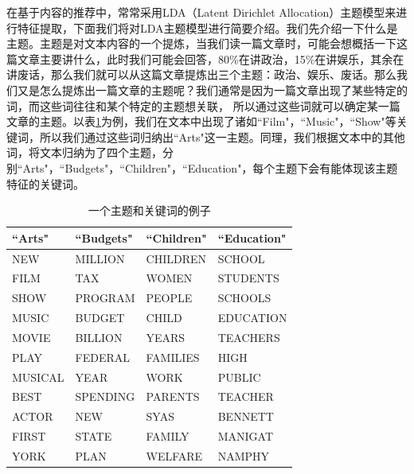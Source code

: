 \documentclass[master,winfonts]{njuthesis}
\begin{document}
在基于内容的推荐中，常常采用LDA（Latent Dirichlet Allocation）\cite{Blei2003Latent}主题模型来进行特征提取，下面我们将对LDA主题模型进行简要介绍。我们先介绍一下什么是主题。主题是对文本内容的一个提炼，当我们读一篇文章时，可能会想概括一下这篇文章主要讲什么，此时我们可能会回答，80\%在讲政治，15\%在讲娱乐，其余在讲废话，那么我们就可以从这篇文章提炼出三个主题：政治、娱乐、废话。那么我们又是怎么提炼出一篇文章的主题呢？我们通常是因为一篇文章出现了某些特定的词，而这些词往往和某个特定的主题想关联， 所以通过这些词就可以确定某一篇文章的主题。以表\ref{topic_table}为例，我们在文本中出现了诸如``Film"，``Music"，``Show"等关键词，所以我们通过这些词归纳出``Arts"这一主题。同理，我们根据文本中的其他词，将文本归纳为了四个主题，分别``Arts"，``Budgets"，``Children"，``Education"，每个主题下会有能体现该主题特征的关键词。
\begin{table}[htbp]
\centering
\caption{一个主题和关键词的例子}
\label{topic_table}
\begin{tabular}{llll}
\hline
``Arts"  & ``Budgets" & ``Children" & ``Education" \\ \hline
NEW     & MILLION   & CHILDREN   & SCHOOL      \\
FILM    & TAX       & WOMEN      & STUDENTS    \\
SHOW    & PROGRAM   & PEOPLE     & SCHOOLS     \\
MUSIC   & BUDGET    & CHILD      & EDUCATION   \\
MOVIE   & BILLION   & YEARS      & TEACHERS    \\
PLAY    & FEDERAL   & FAMILIES   & HIGH        \\
MUSICAL & YEAR      & WORK       & PUBLIC      \\
BEST    & SPENDING  & PARENTS    & TEACHER     \\
ACTOR   & NEW       & SYAS       & BENNETT     \\
FIRST   & STATE     & FAMILY     & MANIGAT     \\
YORK    & PLAN      & WELFARE    & NAMPHY     
\end{tabular}
\end{table}
\end{document}
